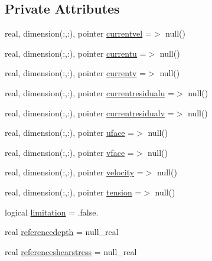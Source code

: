 \subsection*{Private Attributes}
\begin{DoxyCompactItemize}
\item 
real, dimension(\+:,\+:), pointer \mbox{\hyperlink{structmoduleinterfacesedimentwater_1_1t__shear_af9cb891ee4f9244313b09ac4131c6d26}{currentvel}} =$>$ null()
\item 
real, dimension(\+:,\+:), pointer \mbox{\hyperlink{structmoduleinterfacesedimentwater_1_1t__shear_a20e40ff5ada283e2ffe8ff3c80cad742}{currentu}} =$>$ null()
\item 
real, dimension(\+:,\+:), pointer \mbox{\hyperlink{structmoduleinterfacesedimentwater_1_1t__shear_aade31fc6df484b80013186f13c71ee80}{currentv}} =$>$ null()
\item 
real, dimension(\+:,\+:), pointer \mbox{\hyperlink{structmoduleinterfacesedimentwater_1_1t__shear_acd2060c8b558dc7636a7dca4f8dbded7}{currentresidualu}} =$>$ null()
\item 
real, dimension(\+:,\+:), pointer \mbox{\hyperlink{structmoduleinterfacesedimentwater_1_1t__shear_a6ca241d82877d56df066d77a91abac0f}{currentresidualv}} =$>$ null()
\item 
real, dimension(\+:,\+:), pointer \mbox{\hyperlink{structmoduleinterfacesedimentwater_1_1t__shear_a4d4a5ec668829e434fac79616e813edc}{uface}} =$>$ null()
\item 
real, dimension(\+:,\+:), pointer \mbox{\hyperlink{structmoduleinterfacesedimentwater_1_1t__shear_a9f4b6e349ad399bcac1b1359447b6105}{vface}} =$>$ null()
\item 
real, dimension(\+:,\+:), pointer \mbox{\hyperlink{structmoduleinterfacesedimentwater_1_1t__shear_afefb87ef9ef9943c4aef27d2e170df24}{velocity}} =$>$ null()
\item 
real, dimension(\+:,\+:), pointer \mbox{\hyperlink{structmoduleinterfacesedimentwater_1_1t__shear_ad8edb614120128df699ddc31f04f13ff}{tension}} =$>$ null()
\item 
logical \mbox{\hyperlink{structmoduleinterfacesedimentwater_1_1t__shear_a1fcbc56033658189874ee7e865c5f7eb}{limitation}} = .false.
\item 
real \mbox{\hyperlink{structmoduleinterfacesedimentwater_1_1t__shear_ac4a7660cde1f5a4bfa8041d8e03fc138}{referencedepth}} = null\+\_\+real
\item 
real \mbox{\hyperlink{structmoduleinterfacesedimentwater_1_1t__shear_ab4e04c55ea3d82452b23f353a8c5f0ac}{referenceshearstress}} = null\+\_\+real

\end{DoxyCompactItemize}
